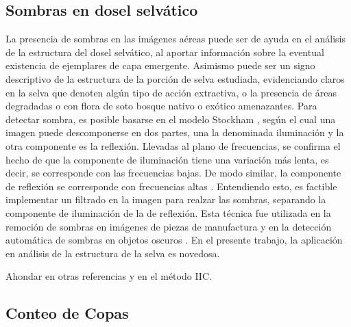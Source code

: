 \subsection{Sombras en dosel selvático}
La presencia de sombras en las imágenes aéreas puede ser de ayuda en el análisis de la estructura del dosel selvático, al aportar información sobre la eventual existencia de ejemplares de capa emergente. Asimismo puede ser un signo descriptivo de la estructura de la porción de selva estudiada, evidenciando claros en la selva que denoten algún tipo de acción extractiva, o la presencia de áreas degradadas o con flora de soto bosque nativo o exótico amenazantes.
Para detectar sombra, es posible basarse en el modelo Stockham \cite{stockham_image_1972}, según el cual una imagen puede descomponerse en dos partes, una la denominada iluminación y la otra componente es la reflexión. Llevadas al plano de frecuencias, se confirma el hecho de que la componente de iluminación tiene una variación más lenta, es decir, se corresponde con las frecuencias bajas. De modo similar, la componente de reflexión se corresponde con frecuencias altas \cite{oppenheim_nonlinear_1968}. Entendiendo esto, es factible implementar un filtrado en la imagen para realzar las sombras, separando la componente de iluminación de la de reflexión. Esta técnica fue utilizada en la remoción de sombras en imágenes de piezas de manufactura \cite{yang_research_2012} y en la detección automática de sombras en objetos oscuros \cite{etemadnia_automatic_2003}. En el presente trabajo, la aplicación en análisis de la estructura de la selva es novedosa.

Ahondar en otras referencias y en el método IIC.
\subsection{Conteo de Copas}


